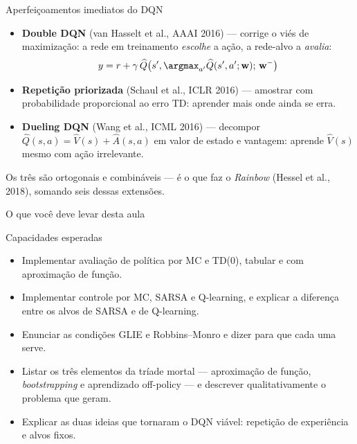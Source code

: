 \documentclass[aspectratio=169, 11pt]{beamer}
\newcommand{\Qhat}{\widehat{Q}}
\newcommand{\Vhat}{\widehat{V}}
\newcommand{\wv}{\mathbf{w}}
\newcommand{\wtar}{\mathbf{w}^{-}}
\begin{document}
\begin{frame}{Aperfeiçoamentos imediatos do DQN}

  \begin{itemize}\setlength{\itemsep}{0.5ex}
    \item \textbf{Double DQN} (van Hasselt et al., AAAI 2016) --- corrige o
      viés de maximização: a rede em treinamento \emph{escolhe} a ação,
      a rede-alvo a \emph{avalia}:
      \[ y = r + \gamma\, \Qhat\bigl(s', \argmax_{a'} \Qhat(s',a';\wv);\, \wtar\bigr) \]
    \item \textbf{Repetição priorizada} (Schaul et al., ICLR 2016) ---
      amostrar com probabilidade proporcional ao erro TD: aprender mais
      onde ainda se erra.
    \item \textbf{Dueling DQN} (Wang et al., ICML 2016) --- decompor
      $\Qhat(s,a) = \Vhat(s) + \widehat{A}(s,a)$ em valor de estado e
      vantagem: aprende $\Vhat(s)$ mesmo com ação irrelevante.
  \end{itemize}

  \begin{ideiabox}
    Os três são ortogonais e combináveis — é o que faz o \emph{Rainbow}
    (Hessel et al., 2018), somando seis dessas extensões.
  \end{ideiabox}
\end{frame}

\begin{frame}{O que você deve levar desta aula}

  \begin{defbox}{Capacidades esperadas}
    \begin{itemize}\setlength{\itemsep}{0.3ex}
      \item Implementar avaliação de política por MC e TD(0), tabular e com
        aproximação de função.
      \item Implementar controle por MC, SARSA e Q-learning, e explicar a
        diferença entre os alvos de SARSA e de Q-learning.
      \item Enunciar as condições GLIE e Robbins--Monro e dizer para que
        cada uma serve.
      \item Listar os três elementos da tríade mortal --- aproximação de
        função, \emph{bootstrapping} e aprendizado off-policy --- e
        descrever qualitativamente o problema que geram.
      \item Explicar as duas ideias que tornaram o DQN viável: repetição de
        experiência e alvos fixos.
    \end{itemize}
  \end{defbox}

\end{frame}
\end{document}
